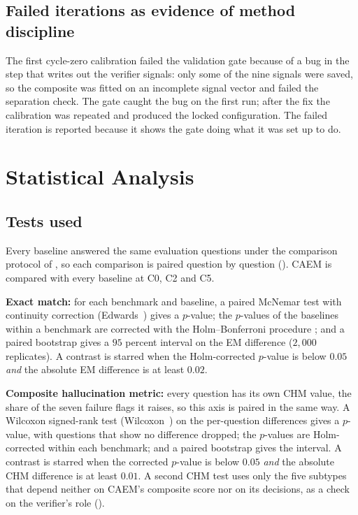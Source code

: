 \subsection{Failed iterations as evidence of method discipline}
\label{sec:adj-failed-iterations}

The first cycle-zero calibration failed the validation gate because of a bug in the step that writes out the verifier signals: only some of the nine signals were saved, so the composite was fitted on an incomplete signal vector and failed the separation check. The gate caught the bug on the first run; after the fix the calibration was repeated and produced the locked configuration. The failed iteration is reported because it shows the gate doing what it was set up to do.

\section{Statistical Analysis}
\label{sec:significance}

\subsection{Tests used}
\label{sec:sig-pairing}
\label{sec:sig-mcnemar}
\label{sec:sig-bootstrap}
\label{sec:sig-holm}
\label{sec:sig-licensing}

Every baseline answered the same evaluation questions under the comparison protocol of , so each comparison is paired question by question (). CAEM is compared with every baseline at C0, C2 and C5.

\textbf{Exact match:} for each benchmark and baseline, a paired McNemar test with continuity correction (Edwards~\cite{edwards1948note}) gives a $p$-value; the $p$-values of the baselines within a benchmark are corrected with the Holm--Bonferroni procedure \cite{holm1979simple}; and a paired bootstrap gives a $95$ percent interval on the EM difference ($2{,}000$ replicates). A contrast is starred when the Holm-corrected $p$-value is below $0.05$ \emph{and} the absolute EM difference is at least $0.02$.

\textbf{Composite hallucination metric:} every question has its own CHM value, the share of the seven failure flags it raises, so this axis is paired in the same way. A Wilcoxon signed-rank test (Wilcoxon~\cite{wilcoxon1945individual}) on the per-question differences gives a $p$-value, with questions that show no difference dropped; the $p$-values are Holm-corrected within each benchmark; and a paired bootstrap gives the interval. A contrast is starred when the corrected $p$-value is below $0.05$ \emph{and} the absolute CHM difference is at least $0.01$. A second CHM test uses only the five subtypes that depend neither on CAEM's composite score nor on its decisions, as a check on the verifier's role ().

